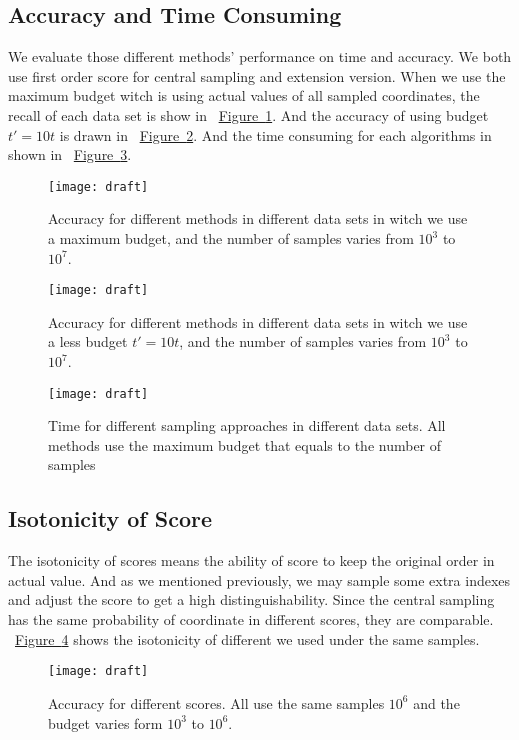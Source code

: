 \documentclass[letterpaper]{article}
\newcommand{\Fig}[1] {\hyperref[fig:#1] {Figure~\ref*{fig:#1}}} %
\begin{document}
\subsection{Accuracy and Time Consuming}
We evaluate those different methods' performance on time and accuracy. We both use first order score for central sampling and extension version.
When we use the maximum budget witch is using actual values of all sampled coordinates, the recall of each data set is show in ~\Fig{RecallMaxBudget}. And the accuracy of using budget $t'=10t$ is drawn in ~\Fig{RecallBudget}. And the time consuming for each algorithms in shown in ~\Fig{Time}.
\begin{figure}[ht]
  \centering
  \texttt{[image: draft]}\\
  \caption{Accuracy for different methods in different data sets in witch we use a maximum budget, and the number of samples varies from $10^3$ to $10^7$.}
  \label{fig:RecallMaxBudget}
\end{figure}

\begin{figure}[ht]
  \centering
  \texttt{[image: draft]}\\
  \caption{Accuracy for different methods in different data sets in witch we use a less budget $t'=10t$, and the number of samples varies from $10^3$ to $10^7$.}
  \label{fig:RecallBudget}
\end{figure}

\begin{figure}[ht]
  \centering
  \texttt{[image: draft]}\\
  \caption{Time for different sampling approaches in different data sets. All methods use the maximum budget that equals to the number of samples}
  \label{fig:Time}
\end{figure}
\subsection{Isotonicity of Score}
The isotonicity of scores means the ability of score to keep the original order in actual value. And as we mentioned previously, we may sample some extra indexes and adjust the score to get a high distinguishability. Since the central sampling has the same probability of coordinate in different scores, they are comparable. ~\Fig{Isotonicity} shows the isotonicity of different we used under the same samples.
\begin{figure}[ht]
  \centering
  \texttt{[image: draft]}\\
  \caption{Accuracy for different scores. All use the same samples $10^6$ and the budget varies form $10^3$ to $10^6$.}
  \label{fig:Isotonicity}
\end{figure}
\end{document}
